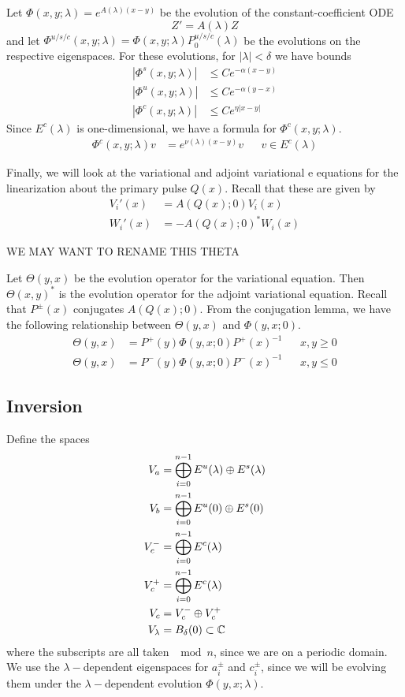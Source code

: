 \documentclass[thesis.tex]{subfiles}
\begin{document}
Let $\Phi(x, y; \lambda) = e^{A(\lambda)(x-y)}$ be the evolution of the constant-coefficient ODE
\[
Z' = A(\lambda) Z
\]
and let $\Phi^{u/s/c}(x, y; \lambda) = \Phi(x, y; \lambda)P^{u/s/c}_0(\lambda)$ be the evolutions on the respective eigenspaces. For these evolutions, for $|\lambda| < \delta$ we have bounds
\begin{equation}\label{Zevolbounds}
\begin{aligned}
|\Phi^s(x, y; \lambda)| &\leq C e^{-\alpha(x - y)} \\
|\Phi^u(x, y; \lambda)| &\leq C e^{-\alpha(y - x)} \\
|\Phi^c(x, y; \lambda)| &\leq C e^{\eta|x - y|} 
\end{aligned}
\end{equation}
Since $E^c(\lambda)$ is one-dimensional, we have a formula for $\Phi^c(x, y; \lambda)$.
\begin{align}\label{centerevol}
\Phi^c(x, y; \lambda) v &= e^{\nu(\lambda)(x - y)} v && v \in E^c(\lambda)
\end{align}

Finally, we will look at the variational and adjoint variational e
equations for the linearization about the primary pulse $Q(x)$. Recall that these are given by 
\begin{align*}
V_i'(x) &= A(Q(x); 0) V_i(x) \\
W_i'(x) &= -A(Q(x); 0)^* W_i(x)
\end{align*}

WE MAY WANT TO RENAME THIS THETA

Let $\Theta(y, x)$ be the evolution operator for the variational equation. Then $\Theta(x, y)^*$ is the evolution operator for the adjoint variational equation. Recall that $P^\pm(x)$ conjugates $A(Q(x); 0)$. From the conjugation lemma, we have the following relationship between $\Theta(y, x)$ and $\Phi(y, x; 0)$.
\begin{align*}
\Theta(y, x) &= P^+(y) \Phi(y, x; 0) P^+(x)^{-1} && x, y \geq 0 \\
\Theta(y, x) &= P^-(y) \Phi(y, x; 0) P^-(x)^{-1} && x, y \leq 0
\end{align*}

\subsection{Inversion}

Define the spaces
\begin{align*}
V_a &= \bigoplus_{i=0}^{n-1} E^u(\lambda) \oplus E^s(\lambda) \\
V_b &= \bigoplus_{i=0}^{n-1} E^u(0) \oplus E^s(0) \\
V_c^- &= \bigoplus_{i=0}^{n-1} E^c(\lambda) \\
V_c^+ &= \bigoplus_{i=0}^{n-1} E^c(\lambda) \\
V_c &= V_c^- \oplus V_c^+ \\
V_\lambda &= B_\delta(0) \subset {\mathbb C}
\end{align*}
where the subscripts are all taken $\mod n$, since we are on a periodic domain. We use the $\lambda-$dependent eigenspaces for $a_i^\pm$ and $c_i^\pm$, since we will be evolving them under the $\lambda-$dependent evolution $\Phi(y, x; \lambda)$.
\end{document}
